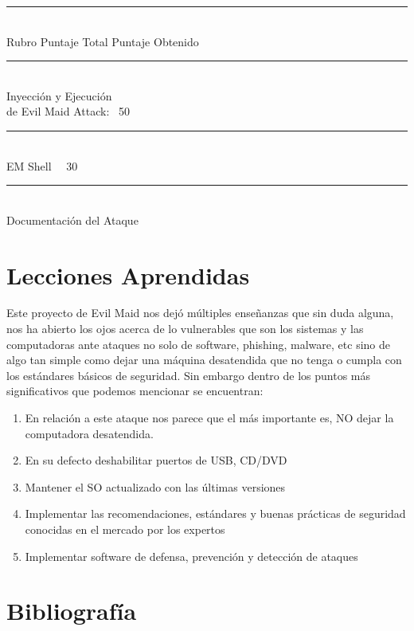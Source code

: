 \documentclass{article}
\begin{document}
    \noindent\rule{10cm}{0.4pt} \\
    Rubro   \qquad \qquad \qquad \qquad Puntaje Total    \qquad  Puntaje Obtenido \\
    \noindent\rule{10cm}{0.4pt} \\
    Inyección y Ejecución \\ 
    de Evil Maid Attack: \qquad \qquad \ 50 \qquad \\ 
    \noindent\rule{10cm}{0.1pt} \\
    EM Shell \qquad \qquad \qquad \qquad \quad \ \ 30 \qquad \\
    \noindent\rule{10cm}{0.1pt} \\
    Documentación del Ataque  \qquad

\section*{Lecciones Aprendidas}

Este proyecto de Evil Maid nos dejó múltiples enseñanzas que sin duda alguna, nos ha abierto los ojos acerca de lo vulnerables que son los sistemas y las computadoras ante ataques no solo de software, phishing, malware, etc sino de algo tan simple como dejar una máquina desatendida que no tenga o cumpla con los estándares básicos de seguridad. Sin embargo dentro de los puntos más significativos que podemos mencionar se encuentran:

\begin{enumerate}
    \item En relación a este ataque nos parece que el más importante es, NO dejar la computadora desatendida.
    
    \item En su defecto deshabilitar puertos de USB, CD/DVD
    
    \item Mantener el SO actualizado con las últimas versiones
    
    \item Implementar las recomendaciones, estándares y buenas prácticas de seguridad conocidas en el mercado por los expertos
    
    \item Implementar software de defensa, prevención y detección de ataques
    
\end{enumerate}

\section*{Bibliografía}
\end{document}
